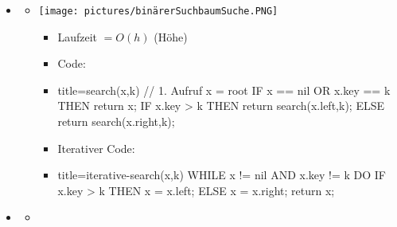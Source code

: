 \documentclass[
    12pt,
    a4paper,
    ngerman,
    color=3b,%
    marginpar=false,
    colorback=false,
    leqno,
]{tudaexercise}
\begin{document}
\begin{itemize}
    \item {}
          \begin{itemize}
              \item[]
                    \begin{minipage}{0.4\textwidth}
                        \texttt{[image: pictures/binärerSuchbaumSuche.PNG]}
                    \end{minipage}
                    \begin{minipage}{0.5\textwidth}
                        \begin{itemize}
                            \item Laufzeit $= O(h)$ (Höhe)
                            \item Code:
                            \item[]
                                  \begin{ccode}[autogobble]{title={search(x,k) // 1. Aufruf x = root}}
                                      IF x == nil OR x.key == k THEN
                                        return x;
                                      IF x.key > k THEN
                                        return search(x.left,k);
                                      ELSE
                                        return search(x.right,k);
                                  \end{ccode}
                            \item Iterativer Code:
                            \item[]
                                  \begin{ccode}[autogobble]{title={iterative-search(x,k)}}
                                      WHILE x != nil AND x.key != k DO
                                        IF x.key > k THEN
                                            x = x.left;
                                        ELSE
                                            x = x.right;
                                      return x;
                                  \end{ccode}
                        \end{itemize}
                    \end{minipage}
          \end{itemize}
          \clearpage
    \item {}
          \begin{itemize}
              \item[]

\end{itemize}
\end{itemize}
\end{document}
